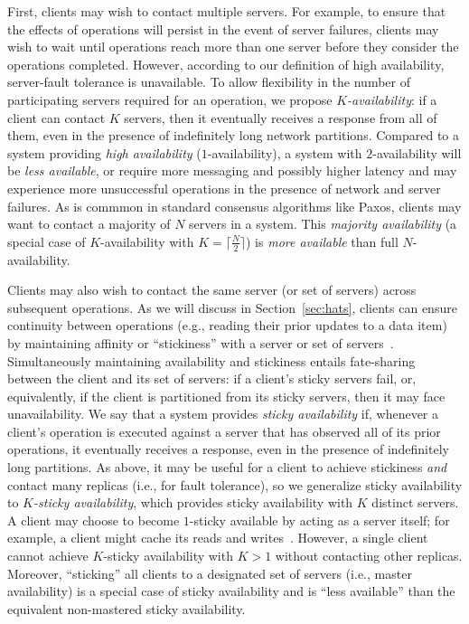 First, clients may wish to contact multiple servers. For example, to
ensure that the effects of operations will persist in the event of
server failures, clients may wish to wait until operations reach more
than one server before they consider the operations
completed. However, according to our definition of high availability,
server-fault tolerance is unavailable. To allow flexibility in the
number of participating servers required for an operation, we propose
\textit{$K$-availability}: if a client can contact $K$ servers, then
it eventually receives a response from all of them, even in the
presence of indefinitely long network partitions. Compared to a system
providing \textit{high availability} ($1$-availability), a system with
$2$-availability will be \textit{less available}, or require more
messaging and possibly higher latency and may experience more
unsuccessful operations in the presence of network and server
failures.  As is commmon in standard consensus algorithms like Paxos,
clients may want to contact a majority of $N$ servers in a
system. This \textit{majority availability} (a special case of
$K$-availability with $K=\lceil \frac{N}{2} \rceil$) is \textit{more
  available} than full $N$-availability.

Clients may also wish to contact the same server (or set of servers)
across subsequent operations. As we will discuss in
Section~\ref{sec:hats}, clients can ensure continuity between
operations (e.g., reading their prior updates to a data item) by
maintaining affinity or ``stickiness'' with a server or set of
servers~\cite{vogels-defs}. Simultaneously maintaining availability
and stickiness entails fate-sharing between the client and its set of
servers: if a client's sticky servers fail, or, equivalently, if the
client is partitioned from its sticky servers, then it may face
unavailability. We say that a system provides \textit{sticky
  availability} if, whenever a client's operation is executed against
a server that has observed all of its prior operations, it eventually
receives a response, even in the presence of indefinitely long
partitions. As above, it may be useful for a client to achieve
stickiness \textit{and} contact many replicas (i.e., for fault
tolerance), so we generalize sticky availability to \textit{$K$-sticky
  availability}, which provides sticky availability with $K$ distinct
servers. A client may choose to become $1$-sticky available by acting
as a server itself; for example, a client might cache its reads and
writes~\cite{bolton, sessionguarantees, swift}. However, a single client
cannot achieve $K$-sticky availability with $K>1$ without contacting
other replicas. Moreover, ``sticking'' all clients to a designated set
of servers (i.e., master availability) is a special case of sticky
availability and is ``less available'' than the equivalent
non-mastered sticky availability.


